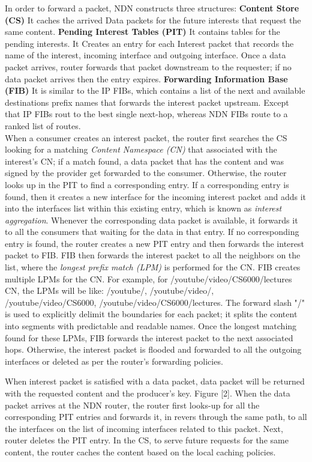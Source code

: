 \documentclass[conference]{IEEEtran}
\begin{document}
In order to forward a packet, NDN constructs three structures\cite{Zhang:2014:NDN:2656877.2656887}: \textbf{Content Store (CS)} It caches the arrived Data packets for the future interests that request the same content. \textbf{Pending Interest Tables (PIT)} It contains tables for the pending interests. It Creates an entry for each Interest packet that records the name of the interest, incoming interface and outgoing interface. Once a data packet arrives, router forwards that packet downstream to the requester; if no data packet arrives then the entry expires. \textbf{Forwarding Information Base (FIB)} It is similar to the IP FIBs, which contains a list of the next and available destinations prefix names that forwards the interest packet upstream. Except that IP FIBs rout to the best single next-hop, whereas NDN FIBs route to a ranked list of routes.\\
When a consumer creates an interest packet, the router first searches the CS looking for a matching \textit{Content Namespace (CN)} that associated with the interest's CN; if a match found, a data packet that has the content and was signed by the provider get forwarded to the consumer. Otherwise, the router looks up in the PIT to find a corresponding entry. If a corresponding entry is found, then it creates a new interface for the incoming interest packet and adds it into the interfaces list within this existing entry, which is known as \textit{interest aggregation}. Whenever the corresponding data packet is available, it forwards it to all the consumers that waiting for the data in that entry. If no corresponding entry is found, the router creates a new PIT entry and then forwards the interest packet to FIB. FIB then forwards the interest packet to all the neighbors on the list, where the \textit{longest prefix match (LPM)} is performed for the CN. FIB creates multiple LPMs for the CN. For example, for /youtube/video/CS6000/lectures CN, the LPMs will be like: /youtube/, /youtube/video/, /youtube/video/CS6000, /youtube/video/CS6000/lectures. The forward slash "/" is used to explicitly delimit the boundaries for each packet; it splits the content into segments with predictable and readable names. Once the longest matching found for these LPMs, FIB forwards the interest packet to the next associated hops. Otherwise, the interest packet is flooded and forwarded to all the outgoing interfaces or deleted as per the router's forwarding policies.

When interest packet is satisfied with a data packet, data packet will be returned with the requested content and the producer's key. Figure [2]. When the data packet arrives at the NDN router, the router first looks-up for all the corresponding PIT entries and forwards it, in revers through the same path, to all the interfaces on the list of incoming interfaces related to this packet. Next, router deletes the PIT entry. In the CS, to serve future requests for the same content, the router caches the content based on the local caching policies. 
\end{document}
